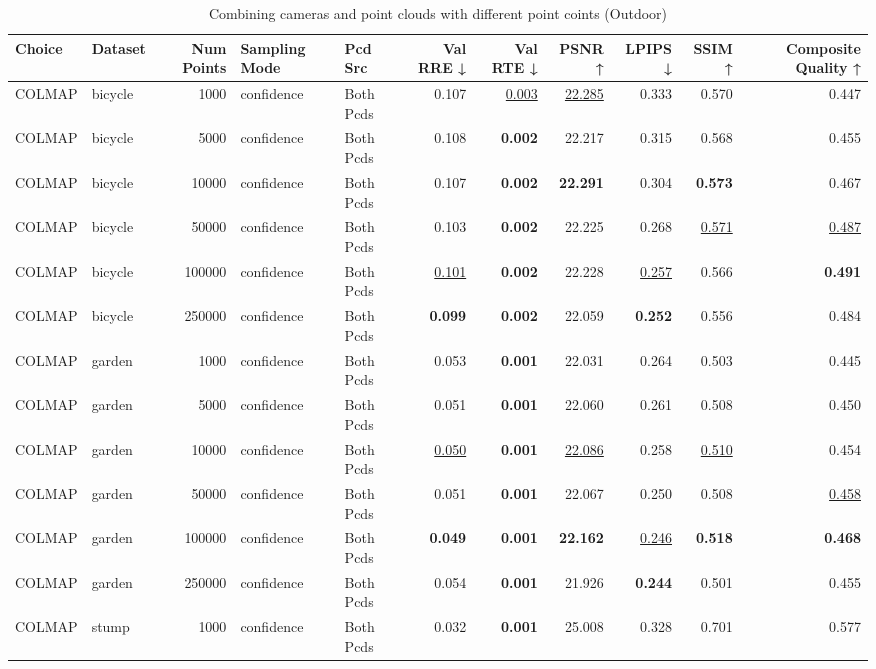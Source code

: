 \begin{table}[H]
\caption{Combining cameras and point clouds with different point coints (Outdoor)}
\label{tab:07_combined_num_points_outdoor}
\centering
\scriptsize
\begin{tabular}{llrllrrrrrr}
\toprule
Choice & Dataset & Num Points & Sampling Mode & Pcd Src & Val RRE ↓ & Val RTE ↓ & PSNR ↑ & LPIPS ↓ & SSIM ↑ & Composite Quality ↑ \\
\midrule
COLMAP & bicycle & 1000 & confidence & Both Pcds & 0.107 & \underline{0.003} & \underline{22.285} & 0.333 & 0.570 & 0.447 \\
COLMAP & bicycle & 5000 & confidence & Both Pcds & 0.108 & \textbf{0.002} & 22.217 & 0.315 & 0.568 & 0.455 \\
COLMAP & bicycle & 10000 & confidence & Both Pcds & 0.107 & \textbf{0.002} & \textbf{22.291} & 0.304 & \textbf{0.573} & 0.467 \\
COLMAP & bicycle & 50000 & confidence & Both Pcds & 0.103 & \textbf{0.002} & 22.225 & 0.268 & \underline{0.571} & \underline{0.487} \\
COLMAP & bicycle & 100000 & confidence & Both Pcds & \underline{0.101} & \textbf{0.002} & 22.228 & \underline{0.257} & 0.566 & \textbf{0.491} \\
COLMAP & bicycle & 250000 & confidence & Both Pcds & \textbf{0.099} & \textbf{0.002} & 22.059 & \textbf{0.252} & 0.556 & 0.484 \\
\midrule
COLMAP & garden & 1000 & confidence & Both Pcds & 0.053 & \textbf{0.001} & 22.031 & 0.264 & 0.503 & 0.445 \\
COLMAP & garden & 5000 & confidence & Both Pcds & 0.051 & \textbf{0.001} & 22.060 & 0.261 & 0.508 & 0.450 \\
COLMAP & garden & 10000 & confidence & Both Pcds & \underline{0.050} & \textbf{0.001} & \underline{22.086} & 0.258 & \underline{0.510} & 0.454 \\
COLMAP & garden & 50000 & confidence & Both Pcds & 0.051 & \textbf{0.001} & 22.067 & 0.250 & 0.508 & \underline{0.458} \\
COLMAP & garden & 100000 & confidence & Both Pcds & \textbf{0.049} & \textbf{0.001} & \textbf{22.162} & \underline{0.246} & \textbf{0.518} & \textbf{0.468} \\
COLMAP & garden & 250000 & confidence & Both Pcds & 0.054 & \textbf{0.001} & 21.926 & \textbf{0.244} & 0.501 & 0.455 \\
\midrule
COLMAP & stump & 1000 & confidence & Both Pcds & 0.032 & \textbf{0.001} & 25.008 & 0.328 & 0.701 & 0.577 \\

\end{tabular}
\end{table}
